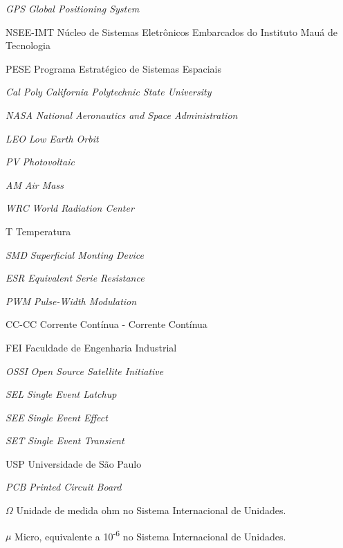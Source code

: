 \documentclass[
	12pt,				%
	openright,			%
	oneside,			%
	a4paper,			%
	english,			%
	french,				%
	spanish,			%
	brazil,				%
	oldfontcommands
	]{abntex2}
\begin{document}
\begin{siglas}

  \item[\textit{GPS}] \textit{Global Positioning System}
  \item[NSEE-IMT] Núcleo de Sistemas Eletrônicos Embarcados do Instituto Mauá de Tecnologia
  \item[PESE] Programa Estratégico de Sistemas Espaciais
  \item[\textit{Cal Poly}] \textit{California Polytechnic State University}
  \item[\textit{NASA}] \textit{National Aeronautics and Space Administration}
  \item[\textit{LEO}] \textit{Low Earth Orbit}
  \item[\textit{PV}] \textit{Photovoltaic}
  \item[\textit{AM}] \textit{Air Mass}
  \item[\textit{WRC}] \textit{World Radiation Center}
  \item[T] Temperatura
  \item[\textit{SMD}] \textit{Superficial Monting Device}
  \item[\textit{ESR}] \textit{Equivalent Serie Resistance}
  \item[\textit{PWM}] \textit{Pulse-Width Modulation}
  \item[CC-CC] Corrente Contínua - Corrente Contínua
  \item[FEI] Faculdade de Engenharia Industrial
  \item[\textit{OSSI}] \textit{Open Source Satellite Initiative}
  \item[\textit{SEL}]\textit{Single Event Latchup}
  \item[\textit{SEE}]\textit{Single Event Effect}
  \item[\textit{SET}]\textit{Single Event Transient}
  \item[USP] Universidade de São Paulo
  \item[\textit{PCB}] \textit{Printed Circuit Board}
      
\end{siglas}

\begin{simbolos}
  \item[$ \Omega $] Unidade de medida ohm no Sistema Internacional de Unidades.
  \item[$ \mu $] Micro, equivalente a 10\textsuperscript{-6} no Sistema Internacional de Unidades.
\end{simbolos}
\end{document}
